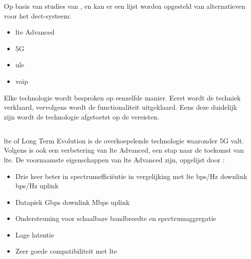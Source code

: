 Op basis van studies van \textcite{Montalvo2024}, \textcite{Kranz2010} en \textcite{Soenmez2018} kan er een lijst worden opgesteld van alternatieven voor het \gls{dect}-systeem:

\begin{itemize}
  \item \gls{lte} Advanced
  \item 5G
  \item \gls{ule}
  \item \gls{voip}
\end{itemize}

Elke technologie wordt besproken op eenzelfde manier. Eerst wordt de techniek verklaard, vervolgens wordt de functionaliteit uitgeklaard. Eens deze duidelijk zijn wordt de technologie afgetoetst op de vereisten.

\subsection{}%
\label{sec:ltea}%

\gls{lte} of Long Term Evolution is de overkoepelende technologie waaronder 5G valt. Volgens \textcite{Bakare2022} is ook een verbetering van \gls{lte} Advanced, een stap naar de toekomst van \gls{lte}. De voornaamste eigenschappen van \gls{lte} Advanced zijn, opgelijst door \textcite{Bakare2022}:

\begin{itemize}
  \item Drie keer beter in spectrumefficiëntie in vergelijking met \gls{lte}
   bps/Hz downlink
   bps/Hz uplink
  \item Datapiek 
   Gbps downlink
   Mbps uplink
  \item Ondersteuning voor schaalbare bandbreedte en spectrumaggregatie
  \item Lage latentie
  \item Zeer goede compatibiliteit met \gls{lte}
\end{itemize}

